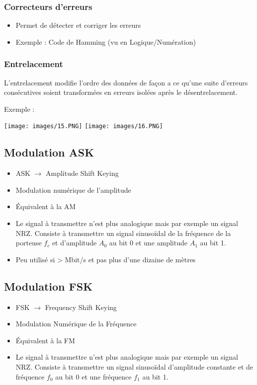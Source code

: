 \documentclass[a4paper]{article}
\begin{document}
\subsubsection{Correcteurs d'erreurs}
\begin{itemize}
    \item Permet de détecter et corriger les erreurs
    \item Exemple : Code de Hamming (vu en Logique/Numération)
\end{itemize}

\subsubsection{Entrelacement}
L'entrelacement modifie l'ordre des données de façon a ce qu'une suite d'erreurs consécutives soient transformées en erreurs isolées après le désentrelacement.

Exemple :
\begin{center}
    \texttt{[image: images/15.PNG]}
    \texttt{[image: images/16.PNG]}
\end{center}

\subsection{Modulation ASK}
\begin{itemize}
    \item ASK $\rightarrow$ Amplitude Shift Keying
    \item Modulation numérique de l'amplitude
    \item Équivalent à la AM
    \item Le signal à transmettre n'est plus analogique mais par exemple un signal NRZ. Consiste à transmettre un signal sinusoïdal de la fréquence de la porteuse $f_c$ et d'amplitude $A_0$ au bit 0 et une amplitude $A_1$ au bit 1.
    \item Peu utilisé si > Mbit/s et pas plus d'une dizaine de mètres
\end{itemize}

\subsection{Modulation FSK}
\begin{itemize}
    \item FSK $\rightarrow$ Frequency Shift Keying
    \item Modulation Numérique de la Fréquence
    \item Équivalent à la FM
    \item Le signal à transmettre n'est plus analogique mais par exemple un signal NRZ. 
Consiste à transmettre un signal sinusoïdal d’amplitude constante et de fréquence $f_0$ au bit 0 et une fréquence $f_1$ au bit 1.
\end{itemize}
\end{document}
